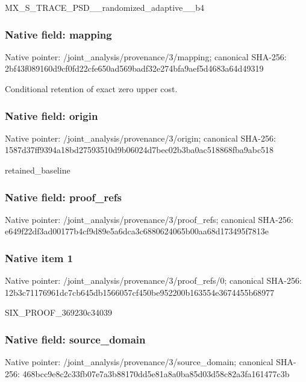 \documentclass[10pt,a4paper]{article}
\begin{document}
\begingroup\raggedright\sloppy MX\_\allowbreak{}S\_\allowbreak{}TRACE\_\allowbreak{}PSD\_\allowbreak{}\_\allowbreak{}randomized\_\allowbreak{}adaptive\_\allowbreak{}\_\allowbreak{}b4\par\endgroup

\subsubsection{Native field: mapping}
Native pointer: /joint\_\allowbreak{}analysis/provenance/3/mapping; canonical SHA-256: 2bf43f089160d9cf0fd22cfe650ad569badf32e274bfa9aef5d4683a64d49319

\begingroup\raggedright\sloppy Conditional retention of exact zero upper cost.\par\endgroup

\subsubsection{Native field: origin}
Native pointer: /joint\_\allowbreak{}analysis/provenance/3/origin; canonical SHA-256: 1587d37ff9394a18bd27593510d9b06024d7bec02b3ba0ac518868fba9abc518

\begingroup\raggedright\sloppy retained\_\allowbreak{}baseline\par\endgroup

\subsubsection{Native field: proof\_\allowbreak{}refs}
Native pointer: /joint\_\allowbreak{}analysis/provenance/3/proof\_\allowbreak{}refs; canonical SHA-256: e649f22df3ad00177b4cf9d89e5a6dca3c6880624065b00aa68d173495f7813e

\subsubsection{Native item 1}
Native pointer: /joint\_\allowbreak{}analysis/provenance/3/proof\_\allowbreak{}refs/0; canonical SHA-256: 12b3c71176961dc7cb645db1566057cf450be952200b163554e3674455b68977

\begingroup\raggedright\sloppy SIX\_\allowbreak{}PROOF\_\allowbreak{}369230c34039\par\endgroup

\subsubsection{Native field: source\_\allowbreak{}domain}
Native pointer: /joint\_\allowbreak{}analysis/provenance/3/source\_\allowbreak{}domain; canonical SHA-256: 468bcc9e8c2c33fb07e7a3b88170dd5e81a8a0ba85d03d58c82a3fa161477c3b
\end{document}
